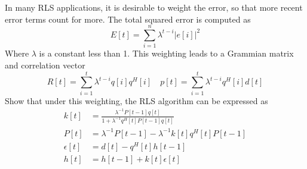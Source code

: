 \documentclass{homework}
\begin{document}
\begin{problem}[4-51]
  In many RLS applications, it is desirable to weight the error, so that more recent error terms count for more. The total squared error is computed as
  \[ E[t] = \sum_{i=1}^{n}  \lambda^{t-i}|e[i]|^2\]
  Where $\lambda$ is a constant less than 1. This weighting leads to a Grammian matrix and correlation vector
  \[R[t] = \sum^{t}_{i=1} \lambda^{t-i}q[i]q^H[i] \quad p[t] = \sum^{t}_{i=1} \lambda^{t-i}q^H[i]d[t]\]
  Show that under this weighting, the RLS algorithm can be expressed as
  \[
    \begin{aligned}
      k[t] &= \frac{\lambda^{-1}P[t-1]q[t]}{1 + \lambda^{-1}q^H[t]P[t-1]q[t]} \\
      P[t] &= \lambda^{-1}P[t-1] - \lambda^{-1}k[t]q^H[t]P[t-1] \\
      \epsilon[t] &= d[t] - q^H[t]h[t-1] \\
      h[t] &= h[t-1] + k[t]\epsilon[t]
    \end{aligned}
  \]
\end{problem}
\end{document}
